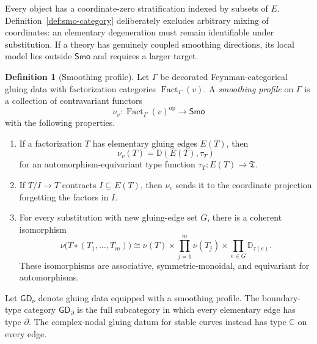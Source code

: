 \documentclass[11pt,letterpaper,twoside]{article}
\theoremstyle{plain}
\theoremstyle{definition}
\newtheorem{definition}[theorem]{Definition}
\theoremstyle{remark}
\newcommand{\BGrm}{\mathsf{GD}_{\partial}}
\newcommand{\LGrm}{\mathsf{GD}_{\nu}}
\newcommand{\Smo}{\mathsf{Smo}}
\DeclareMathOperator{\Fact}{Fact}
\begin{document}
Every object has a coordinate-zero stratification indexed by subsets of \(E\).  Definition~\ref{def:smo-category} deliberately excludes arbitrary mixing of coordinates: an elementary degeneration must remain identifiable under substitution.  If a theory has genuinely coupled smoothing directions, its local model lies outside \(\Smo\) and requires a larger target.

\begin{definition}[Smoothing profile]\label{def:smoothing-profile}
Let \(\Gamma\) be decorated Feynman-categorical gluing data with factorization categories \(\Fact_\Gamma(v)\).  A \emph{smoothing profile} on \(\Gamma\) is a collection of contravariant functors
\begin{equation}\label{eq:smoothing-functor}
 \nu_v:\Fact_\Gamma(v)^{\mathrm{op}}\longrightarrow\Smo
\end{equation}
with the following properties.
\begin{enumerate}
\item If a factorization \(T\) has elementary gluing edges \(E(T)\), then
\[
 \nu_v(T)=\mathbb D(E(T),\tau_T)
\]
for an automorphism-equivariant type function \(\tau_T:E(T)\to\mathfrak T\).
\item If \(T/I\to T\) contracts \(I\subseteq E(T)\), then \(\nu_v\) sends it to the coordinate projection forgetting the factors in \(I\).
\item For every substitution with new gluing-edge set \(G\), there is a coherent isomorphism
\begin{equation}\label{eq:profile-substitution}
 \nu\bigl(T\circ(T_1,\ldots,T_m)\bigr)
 \cong \nu(T)\times\prod_{j=1}^m\nu(T_j)
 \times\prod_{e\in G}\mathbb D_{\tau(e)}.
\end{equation}
These isomorphisms are associative, symmetric-monoidal, and equivariant for automorphisms.
\end{enumerate}
\end{definition}

Let \(\LGrm\) denote gluing data equipped with a smoothing profile.  The boundary-type category \(\BGrm\) is the full subcategory in which every elementary edge has type \(\partial\).  The complex-nodal gluing datum for stable curves instead has type \(\mathbb C\) on every edge.
\end{document}
